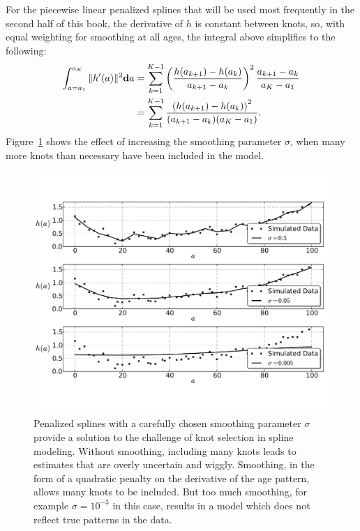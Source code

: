 For the piecewise linear penalized splines that will be used most
frequently in the second half of this book, the derivative of $h$ is
constant between knots, so, with equal weighting for smoothing at all
ages, the integral above simplifies to the following:
\begin{align*}
\int _{a=a_1} ^{a_K} \| h'(a) \|^2 \mathbf{d} a
& = \sum_{k=1} ^{K-1} \left(\frac{h(a_{k+1}) - h(a_k)}{a_{k+1}-a_k}\right)^2 \frac{a_{k+1}-a_k}{a_K - a_1}\\
&= \sum_{k=1} ^{K-1} \frac{\left(h(a_{k+1}) - h(a_k)\right)^2}{(a_{k+1}-a_k)(a_K - a_1)}.
\end{align*}
Figure~\ref{smoothing-splines} shows the effect of increasing the
smoothing parameter $\sigma$, when many more knots than necessary have been included in the model.

\begin{figure}[h]
\begin{center}
\includegraphics[width=\textwidth]{smoothing-splines.pdf}
\caption{Penalized splines with a carefully chosen smoothing parameter
  $\sigma$ provide a solution to the challenge of knot selection in
  spline modeling.  Without smoothing, including many knots leads to
  estimates that are overly uncertain and wiggly.  Smoothing, in the
  form of a quadratic penalty on the derivative of the age pattern,
  allows many knots to be included.  But too much smoothing, for
  example $\sigma=10^{-3}$ in this case, results in a model which does
  not reflect true patterns in the data.}
\label{smoothing-splines}
\end{center}
\end{figure}



